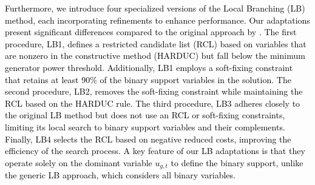 \textcolor{black}{
Furthermore, we introduce four specialized versions of the Local Branching (LB) method, each incorporating refinements to enhance performance. Our adaptations present significant differences compared to the original approach by \citet{Fischetti2003}. The first procedure, LB1, defines a restricted candidate list (RCL) based on variables that are nonzero in the constructive method (HARDUC) but fall below the minimum generator power threshold. Additionally, LB1 employs a soft-fixing constraint that retains at least 90\% of the binary support variables in the solution. The second procedure, LB2, removes the soft-fixing constraint while maintaining the RCL based on the HARDUC rule. The third procedure, LB3 adheres closely to the original LB method but does not use an RCL or soft-fixing constraints, limiting its local search to binary support variables and their complements. Finally, LB4 selects the RCL based on negative reduced costs, improving the efficiency of the search process. A key feature of our LB adaptations is that they operate solely on the dominant variable $u_{g,t}$ to define the binary support, unlike the generic LB approach, which considers all binary variables.
}

